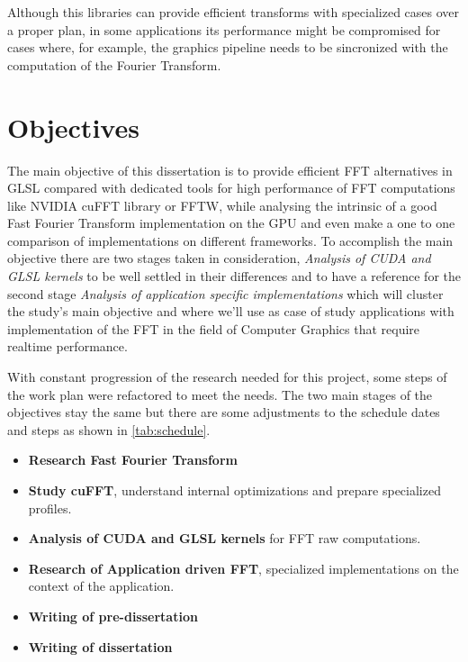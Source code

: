 \documentclass[
  oneside,
  11pt, a4paper,
  footinclude=true,
  headinclude=true,
  cleardoublepage=empty
]{scrbook}
\begin{document}
Although this libraries can provide efficient transforms with specialized cases over a proper plan, in some applications its performance might be compromised for cases where, for example, the graphics pipeline needs to be sincronized with the computation of the Fourier Transform.

\section{Objectives} \label{sec:objectives}

The main objective of this dissertation is to provide efficient FFT alternatives in GLSL compared with dedicated tools for high performance of FFT computations like NVIDIA cuFFT library or FFTW, while analysing the intrinsic of a good Fast Fourier Transform implementation on the GPU and even make a one to one comparison of implementations on different frameworks. %
To accomplish the main objective there are two stages taken in consideration, \textit{Analysis of CUDA and GLSL kernels} to be well settled in their differences and to have a reference for the second stage \textit{Analysis of application specific implementations} which will cluster the study's main objective and where we'll use as case of study applications with implementation of the FFT in the field of Computer Graphics that require realtime performance.


With constant progression of the research needed for this project, some steps of the work plan were refactored to meet the needs. The two main stages of the objectives stay the same but there are some adjustments to the schedule dates and steps as shown in \autoref{tab:schedule}.

\begin{itemize}
    \item \textbf{Research Fast Fourier Transform}
    \item \textbf{Study cuFFT}, understand internal optimizations and prepare specialized profiles.
    \item \textbf{Analysis of CUDA and GLSL kernels} for FFT raw computations.
    \item \textbf{Research of Application driven FFT}, specialized implementations on the context of the application.
    \item \textbf{Writing of pre-dissertation}
    \item \textbf{Writing of dissertation}
\end{itemize}
\end{document}
